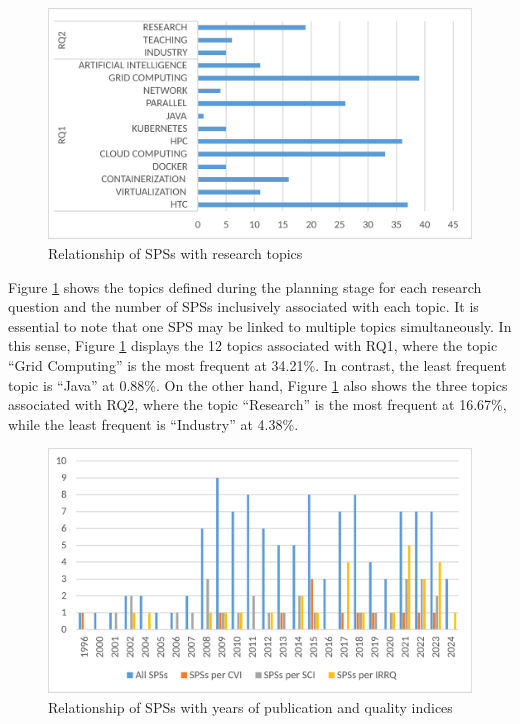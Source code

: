 \begin{figure}[ht]
	\centering
	\includegraphics[scale=0.179]{resources/figures/Imagen3.eps}
	\caption{Relationship of SPSs with research topics}
	\label{fig:SPSsByTopics}
\end{figure}

Figure \ref{fig:SPSsByTopics} shows the topics defined during the planning stage for each research question and the number of SPSs inclusively associated with each topic. It is essential to note that one SPS may be linked to multiple topics simultaneously. In this sense, Figure \ref{fig:SPSsByTopics} displays the 12 topics associated with RQ1, where the topic ``Grid Computing'' is the most frequent at 34.21\%. In contrast, the least frequent topic is ``Java'' at 0.88\%. On the other hand, Figure \ref{fig:SPSsByTopics} also shows the three topics associated with RQ2, where the topic ``Research'' is the most frequent at 16.67\%, while the least frequent is ``Industry'' at 4.38\%.

\begin{figure}[ht]
	\centering
	\includegraphics[scale=0.179]{resources/figures/Imagen4.eps}
	\caption{Relationship of SPSs with years of publication and quality indices}
	\label{fig:SPSsByYearsAndIndexes}
\end{figure}

